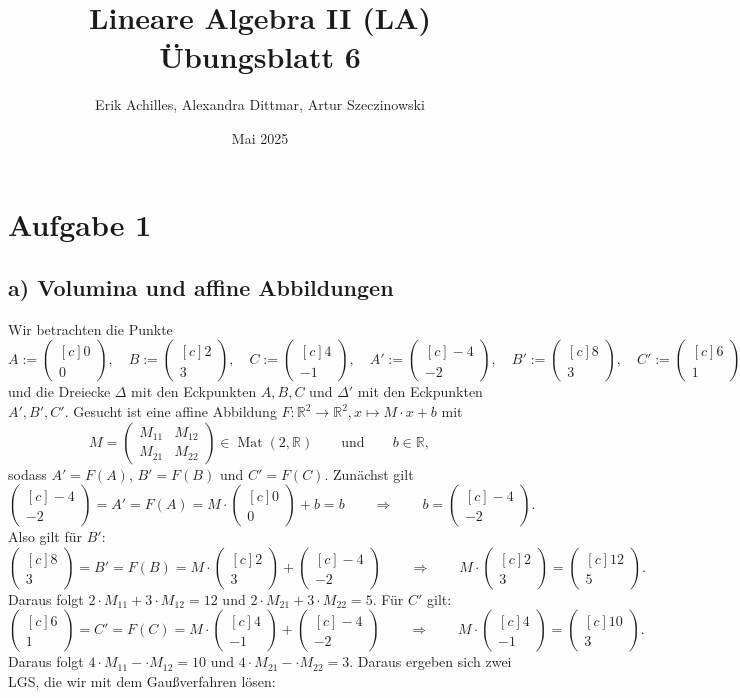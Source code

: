 \documentclass{article}
\title{Lineare Algebra II (LA) Übungsblatt 6}
\author{Erik Achilles, Alexandra Dittmar, Artur Szeczinowski}
\date{Mai 2025}
\newcommand{\RR}{\mathbb{R}}
\newcommand{\imp}{\mathbb{\Rightarrow}}
\DeclareMathOperator{\Mat}{Mat}
\newcommand{\vect}[1]{\begin{pmatrix*}[c] #1 \end{pmatrix*}}
\newcommand{\legs}[2]{\left(\begin{array}{#1}#2\end{array}\right)}
\begin{document}

\section*{Aufgabe 1}
\subsection*{a) Volumina und affine Abbildungen}

Wir betrachten die Punkte
\[
  A := \vect{0\\0}, \quad
  B := \vect{2\\3}, \quad
  C := \vect{4\\-1}, \quad
  A' := \vect{-4\\-2}, \quad
  B' := \vect{8\\3}, \quad
  C' := \vect{6\\1}
  \in \RR^2.
\]
und die Dreiecke $\Delta$ mit den Eckpunkten
$A,B,C$ und $\Delta'$ mit den Eckpunkten
$A',B',C'$.
Gesucht ist eine affine Abbildung
$F: \RR^2 \to \RR^2, x \mapsto M \cdot x + b$
mit
\[
  M = \legs{cc}{ M_{11} & M_{12} \\ M_{21} & M_{22} }
  \in \Mat(2,\RR) \qquad\text{und}\qquad b \in \RR,
\]
sodass $A' = F(A)$, $B' = F(B)$ und $C' = F(C)$.
Zunächst gilt
\[
  \vect{-4\\-2} = A' = F(A) = M \cdot \vect{0\\0} + b = b
  \qquad\imp\qquad
  b = \vect{-4\\-2}.
\]
Also gilt für $B'$:
\[
  \vect{8\\3} = B' = F(B) = M \cdot \vect{2\\3} + \vect{-4\\-2}
  \qquad\imp\qquad
  M \cdot \vect{2\\3} = \vect{12\\5}.
\]
Daraus folgt
$2 \cdot M_{11} + 3 \cdot M_{12} = 12$
und
$2 \cdot M_{21} + 3 \cdot M_{22} = 5$.
Für $C'$ gilt:
\[
  \vect{6\\1} = C' = F(C) = M \cdot \vect{4\\-1} + \vect{-4\\-2}
  \qquad\imp\qquad
  M \cdot \vect{4\\-1} = \vect{10\\3}.
\]
Daraus folgt
$4 \cdot M_{11} - \cdot M_{12} = 10$
und
$4 \cdot M_{21} - \cdot M_{22} = 3$.
Daraus ergeben sich zwei LGS, die wir mit dem Gaußverfahren lösen:
\end{document}
